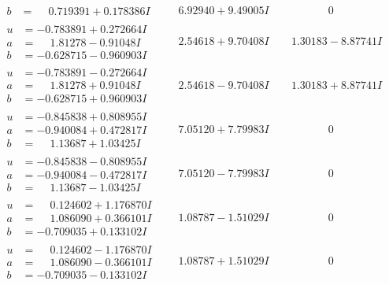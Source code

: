 \documentclass[1p]{elsarticle_modified}
\theoremstyle{definition}
\begin{document}
$$\begin{array}{c|c|c}
\begin{aligned}
b &= \phantom{-}0.719391 + 0.178386 I\end{aligned}
 & \phantom{-}6.92940 + 9.49005 I & \phantom{-0.000000 } 0 \\ \hline\begin{aligned}
u &= -0.783891 + 0.272664 I \\
a &= \phantom{-}1.81278 - 0.91048 I \\
b &= -0.628715 - 0.960903 I\end{aligned}
 & \phantom{-}2.54618 + 9.70408 I & \phantom{-}1.30183 - 8.87741 I \\ \hline\begin{aligned}
u &= -0.783891 - 0.272664 I \\
a &= \phantom{-}1.81278 + 0.91048 I \\
b &= -0.628715 + 0.960903 I\end{aligned}
 & \phantom{-}2.54618 - 9.70408 I & \phantom{-}1.30183 + 8.87741 I \\ \hline\begin{aligned}
u &= -0.845838 + 0.808955 I \\
a &= -0.940084 + 0.472817 I \\
b &= \phantom{-}1.13687 + 1.03425 I\end{aligned}
 & \phantom{-}7.05120 + 7.79983 I & \phantom{-0.000000 } 0 \\ \hline\begin{aligned}
u &= -0.845838 - 0.808955 I \\
a &= -0.940084 - 0.472817 I \\
b &= \phantom{-}1.13687 - 1.03425 I\end{aligned}
 & \phantom{-}7.05120 - 7.79983 I & \phantom{-0.000000 } 0 \\ \hline\begin{aligned}
u &= \phantom{-}0.124602 + 1.176870 I \\
a &= \phantom{-}1.086090 + 0.366101 I \\
b &= -0.709035 + 0.133102 I\end{aligned}
 & \phantom{-}1.08787 - 1.51029 I & \phantom{-0.000000 } 0 \\ \hline\begin{aligned}
u &= \phantom{-}0.124602 - 1.176870 I \\
a &= \phantom{-}1.086090 - 0.366101 I \\
b &= -0.709035 - 0.133102 I\end{aligned}
 & \phantom{-}1.08787 + 1.51029 I & \phantom{-0.000000 } 0 \\ \hline\begin{aligned}

\end{aligned}
\end{array}$$
\end{document}

